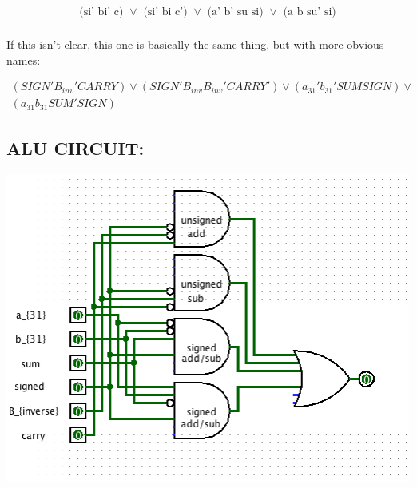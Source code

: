 \documentclass[a4paper]{article}
\begin{document}
\begin{eqnarray*} 
\mbox{(si' bi' c) $\vee$ (si' bi c') $\vee$ (a' b' su si) $\vee$ (a b su' si)} \\
\end{eqnarray*}

If this isn't clear, this one is basically the same thing, but with more obvious names:

\begin{eqnarray*}
(SIGN' B_{inv}' CARRY) \vee (SIGN' B_{inv} B_{inv}' CARRY') \vee (a_{31}' b_{31}' SUM SIGN) \vee \\
(a_{31} b_{31} SUM' SIGN)
\end{eqnarray*}

\subsection*{ALU CIRCUIT:}

\includegraphics[width=150mm]{alu.png}
\end{document}
